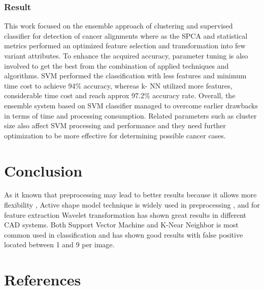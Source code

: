 \documentclass[hidelinks,12pt]{article}
\begin{document}
\subsubsection{Result}
This work focused on
the ensemble approach of clustering and supervised
classifier for detection of cancer alignments where as the
SPCA and statistical metrics performed an optimized
feature selection and transformation into few variant
attributes. To enhance the acquired accuracy, parameter
tuning is also involved to get the best from the
combination of applied techniques and algorithms. SVM
performed the classification with less features and
minimum time cost to achieve 94\%  accuracy, whereas k-
NN utilized more features, considerable time cost and
reach approx 97.2\% accuracy rate. Overall, the ensemble
system based on SVM classifier managed to overcome
earlier drawbacks in terms of time and processing
consumption. Related parameters such as cluster size also
affect SVM processing and performance and they need
further optimization to be more effective for determining
possible cancer cases.
\newpage


\section{Conclusion}
As it known that preprocessing may lead to better results because it allows more flexibility , Active shape model technique is widely
used in preprocessing , and for feature extraction  Wavelet transformation has shown great results in different CAD systems.
Both Support Vector Machine and K-Near Neighbor is most common used in classification and has shown good results with false positive located between 1 and 9 per image.



\newpage
\section{References}
\end{document}

